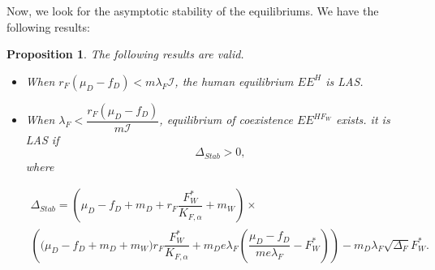 \documentclass{article}
\newcommand{\lfw}{\lambda_{F}}
\newcommand{\lfw}{\lambda_{F}}
\newcommand{\cI}{\mathcal{I}}
\newtheorem{prop}{Proposition}
\begin{document}
Now, we look for the asymptotic stability of the equilibriums. We have the following results:

\begin{prop}\label{propLAS} The following results are valid.
\begin{itemize}
\item When $r_F(\mu_D - f_D) < m \lfw \cI$, the human equilibrium $EE^{H}$ is LAS.
\item When $\lfw < \dfrac{r_F (\mu_D -f_D)}{m \cI}$, equilibrium of coexistence $EE^{HF_W}$  exists. it is LAS if 
$$\Delta_{Stab} > 0,$$  where 

\begin{multline*}
\Delta_{Stab} = \left(\mu_D -f_D + m_D + r_F \dfrac{F_W^*}{K_{F, \alpha}} + m_W\right) \times \\
\left(\big( \mu_D -f_D + m_D + m_W) r_F \dfrac{F^*_W}{K_{F, \alpha}}   + m_D e\lfw   \left(\dfrac{\mu_D - f_D}{m e\lfw} - F^*_W \right)\right) - m_D \lfw \sqrt{\Delta_F}  F^*_{W}.
\end{multline*}
\end{itemize}
\end{prop}
\end{document}
